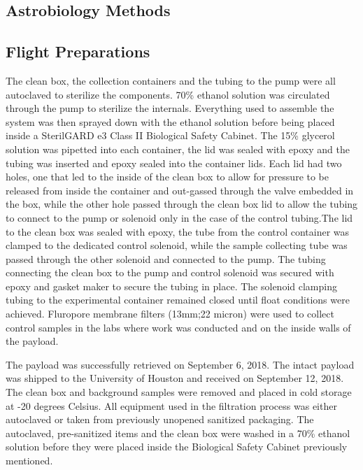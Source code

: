 \subsection{Astrobiology Methods}
\label{sec:Astrobiology Methods}
\subsection{ Flight Preparations }
 The clean box, the collection containers and the tubing to the pump were all autoclaved to sterilize the components. 70\% ethanol solution was circulated through the pump to sterilize the internals. Everything used to assemble the system was then sprayed down with the ethanol solution before being placed inside a SterilGARD e3 Class II Biological Safety Cabinet. The 15\% glycerol solution was pipetted into each container, the lid was sealed with epoxy and the tubing was inserted and epoxy sealed into the container lids. Each lid had two holes, one that led to the inside of the clean box to allow for pressure to be released from inside the container and out-gassed  through the valve embedded in the box, while the other hole passed through the clean box lid to allow the tubing to connect to the pump or solenoid only in the case of the control tubing.The lid to the clean box was sealed with epoxy, the tube from the control container was clamped to the dedicated control solenoid, while the sample collecting tube was passed through the other solenoid and connected to the pump. The tubing connecting the clean box to the pump and control solenoid was secured with epoxy and gasket maker to secure the tubing in place. The solenoid clamping tubing to the experimental container remained closed until float conditions were achieved. Fluropore membrane filters (13mm;22 micron) were used to collect control samples in the labs where work was conducted and on the inside walls of the payload. 
 
 The payload was successfully retrieved on September 6, 2018. The intact payload was shipped to the University of Houston and received on September 12, 2018. The clean box and background samples were removed and placed in cold storage at -20 degrees Celsius.
 All equipment used in the filtration process was either autoclaved or taken from previously unopened sanitized packaging. The autoclaved, pre-sanitized items and the clean box were washed in a 70\% ethanol solution before they were placed inside the Biological Safety Cabinet previously mentioned. 
 
